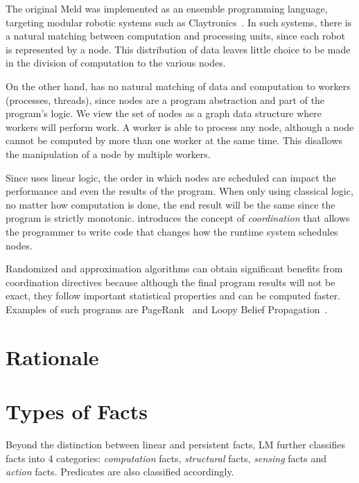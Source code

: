 The original Meld was
implemented as an ensemble programming language, targeting modular robotic systems such as
Claytronics~\cite{ashley-rollman-derosa-iros07wksp}. In such systems, there is a natural matching
between computation and processing units, since each robot is represented by a node. This distribution
of data leaves little choice to be made in the division of computation to the various nodes.

On the other hand, \lang has no natural matching of data and computation to workers (processes, threads),
since nodes are a program abstraction and part of the program's logic.
We view the set of nodes as a graph data structure where workers will perform work.
A worker is able to process any node, although a node cannot be computed by more than one worker
at the same time. This disallows the manipulation of a node by multiple workers.

Since \lang uses linear logic, the order in which nodes are scheduled can impact the
performance and even the results of the program. When only using
classical logic, no matter how computation is done, the end result will be the same since the program
is strictly monotonic.
\lang introduces the concept of \emph{coordination} that allows the programmer
to write code that changes how the runtime system schedules nodes.

Randomized and approximation
algorithms can obtain significant benefits from coordination directives because although the final
program results will not be exact, they follow important statistical properties and can be computed faster.
Examples of such programs are PageRank~\cite{Lubachevsky:1986:CAA:4904.4801} and
Loopy Belief Propagation~\cite{Gonzalez+al:aistats09paraml}.

\section{Rationale}


\section{Types of Facts}

Beyond the distinction between linear and persistent facts, LM further classifies facts
into 4 categories: \emph{computation} facts, \emph{structural} facts, \emph{sensing} facts
and \emph{action} facts. Predicates are also classified accordingly.

